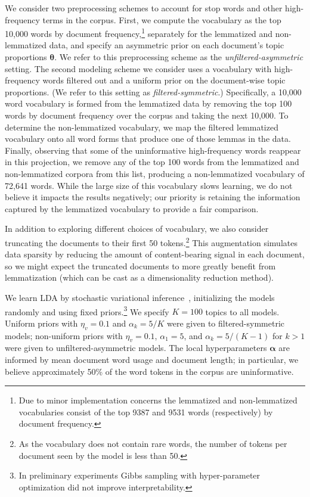\documentclass{clv2}
\renewcommand{\vec}{\boldsymbol}   %
\newcommand{\valpha}{{\vec{\alpha}}}
\newcommand{\vtheta}{{\vec{\theta}}}
\begin{document}
We consider two preprocessing schemes to account for stop words and
other high-frequency terms in the corpus.  First, we compute the
vocabulary as the top 10,000 words by document frequency,\footnote{
    Due to minor implementation concerns the lemmatized and
    non-lemmatized vocabularies consist of the top 9387 and 9531 words
    (respectively) by document frequency.
}
separately for the lemmatized and non-lemmatized data, and
specify an asymmetric prior on each document's topic proportions
$\vtheta$.
We refer to this preprocessing scheme
as the \emph{unfiltered-asymmetric} setting.  The second modeling scheme we
consider uses a vocabulary with high-frequency words filtered out and a
uniform prior on the document-wise topic proportions.
(We refer to this setting as \emph{filtered-symmetric}.)
Specifically, a 10,000 word vocabulary is formed from the
lemmatized data by removing the top 100 words by document frequency
over the corpus and taking the next 10,000.  To determine the
non-lemmatized vocabulary, we map the filtered lemmatized
vocabulary onto all word forms that produce one of those lemmas in
the data.  Finally, observing that some of the uninformative
high-frequency words reappear in this projection, we remove any
of the top 100 words from the lemmatized and non-lemmatized corpora
from this list, producing a non-lemmatized vocabulary of 72,641 words.
While the large size of this vocabulary slows learning,
we do not believe it impacts the results negatively;
our priority is retaining the information captured by the lemmatized
vocabulary to provide a fair comparison.

In addition to exploring different choices of vocabulary, we also
consider truncating the documents to their first 50 tokens.\footnote{
    As the vocabulary does not contain rare words, the number of
    tokens per document seen by the model is less than 50.
}
This augmentation simulates data sparsity by reducing the amount of
content-bearing signal in each document, so we might expect the
truncated documents to more greatly benefit from lemmatization (which
can be cast as a dimensionality reduction method).

We learn LDA by stochastic variational
inference~\cite{hoffman2013}, initializing the models randomly and
using fixed priors.\footnote{
    In preliminary experiments Gibbs
    sampling with hyper-parameter optimization did not improve
    interpretability.
}
We specify $K = 100$ topics to all models.
Uniform priors with $\eta_v = 0.1$ and
$\alpha_k = 5 / K$ were given to
filtered-symmetric models; non-uniform priors with
$\eta_v = 0.1$, $\alpha_1 = 5$, and $\alpha_k = 5 / (K-1)$
for $k > 1$
were given to unfiltered-asymmetric models.
The local hyperparameters $\valpha$ are informed by mean
document word usage and document length; in particular, we
believe approximately 50\% of the word tokens in the corpus are
uninformative.
\end{document}
